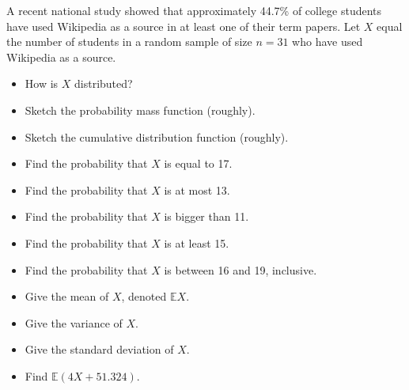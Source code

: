 \begin{xca}
A recent national study showed that approximately 44.7\% of college
students have used Wikipedia as a source in at least one of their term
papers. Let \(X\) equal the number of students in a random sample of
size \(n=31\) who have used Wikipedia as a source.
\begin{itemize}
\item How is \(X\) distributed?
\item Sketch the probability mass function (roughly).
\item Sketch the cumulative distribution function (roughly).
\item Find the probability that \(X\) is equal to 17.
\item Find the probability that \(X\) is at most 13.
\item Find the probability that \(X\) is bigger than 11.
\item Find the probability that \(X\) is at least 15.
\item Find the probability that \(X\) is between 16 and 19, inclusive.
\item Give the mean of \(X\), denoted \(\mathbb{E} X\).
\item Give the variance of \(X\).
\item Give the standard deviation of \(X\).
\item Find \(\mathbb{E}(4X + 51.324)\).
\end{itemize}
\end{xca}

